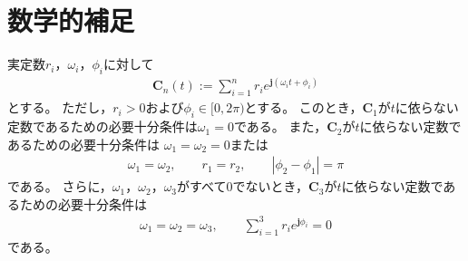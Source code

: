 \documentclass[tombow,dvipdfmx]{corona-a5-1.1}
\begin{document}
\section*{数学的補足}

\begin{補題}\label{lem:sumc}
実定数$r_i$，$\omega_i$，$\phi_i$に対して
\begin{align*}
\bm{C}_n(t) := 
\sum_{i=1}^n r_i e^{ \bm{j} (\omega_i t + \phi_i)}
\end{align*}
とする。
ただし，$r_i>0$および$\phi_i \in [0,2\pi)$とする。
このとき，$\bm{C}_1$が$t$に依らない定数であるための必要十分条件は$\omega_1=0$である。
また，$\bm{C}_2$が$t$に依らない定数であるための必要十分条件は
$\omega_1=\omega_2=0$または
\begin{align*}
\omega_1=\omega_2
,\qquad
r_1=r_2
,\qquad
|\phi_2-\phi_1| = \pi
\end{align*}
である。
さらに，$\omega_1$，$\omega_2$，$\omega_3$がすべて0でないとき，$\bm{C}_3$が$t$に依らない定数であるための必要十分条件は
\begin{align*}
\omega_1=\omega_2=\omega_3
,\qquad
\sum_{i=1}^3 r_i e^{\bm{j}\phi_i}=0
\end{align*}
である。
\end{補題}
\end{document}
